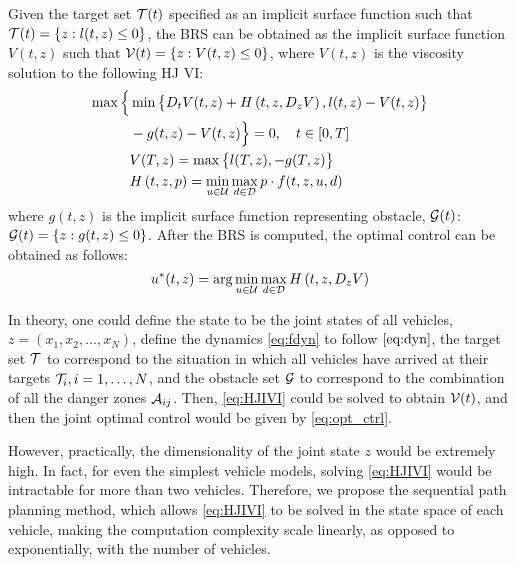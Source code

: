 Given the target set $\mathcal{T}(t)$ specified as an implicit surface function such that $\mathcal{T}(t) = \{z: l(t, z) \le 0\}$, the BRS can be obtained as the implicit surface function $V(t, z)$ such that $\mathcal{V}(t) = \{z: V(t, z) \le 0\}$, where $V(t, z)$ is the viscosity solution \cite{Crandall83} to the following HJ VI:
%
\begin{equation}
\label{eq:HJIVI}
\begin{aligned}
\max\Big\{&\min\big\{D_t V(t, z) + H\left(t, z, D_z V\right), l(t,z) - V(t, z)\big\}\\
& -g(t, z) - V(t, z)\Big\} = 0, \quad t\in[0,T]\\
&V(T, z) = \max\big\{l(T, z), -g(T, z)\big\} \\ 
&H\left(t, z, p\right) = \min_{u \in \mathcal{U}} \max_{d \in \mathcal{D}} p \cdot f(t, z, u, d)
\end{aligned}
\end{equation}
%
\noindent where $g(t, z)$ is the implicit surface function representing obstacle, $\mathcal{G}(t)$: $\mathcal{G}(t) = \{z: g(t, z) \le 0\}$. After the BRS is computed, the optimal control can be obtained as follows:
%
\begin{equation}
\label{eq:opt_ctrl}
u^*(t, z) = \arg \min_{u \in \mathcal{U}} \max_{d \in \mathcal{D}} H\left(t, z, D_z V\right)
\end{equation}

In theory, one could define the state to be the joint states of all vehicles, $z = (x_1, x_2, \ldots, x_N)$, define the dynamics \eqref{eq:fdyn} to follow $\eqref{eq:dyn}$, the target set $\mathcal{T}$ to correspond to the situation in which all vehicles have arrived at their targets $\mathcal{T}_i, i = 1, \ldots, N$, and the obstacle set $\mathcal{G}$ to correspond to the combination of all the danger zones $\mathcal{A}_{ij}$. Then, \eqref{eq:HJIVI} could be solved to obtain $\mathcal{V}(t)$, and then the joint optimal control would be given by \eqref{eq:opt_ctrl}.

However, practically, the dimensionality of the joint state $z$ would be extremely high. In fact, for even the simplest vehicle models, solving \eqref{eq:HJIVI} would be intractable for more than two vehicles. Therefore, we propose  the sequential path planning method, which allows \eqref{eq:HJIVI} to be solved in the state space of each vehicle, making the computation complexity scale linearly, as opposed to exponentially, with the number of vehicles.

